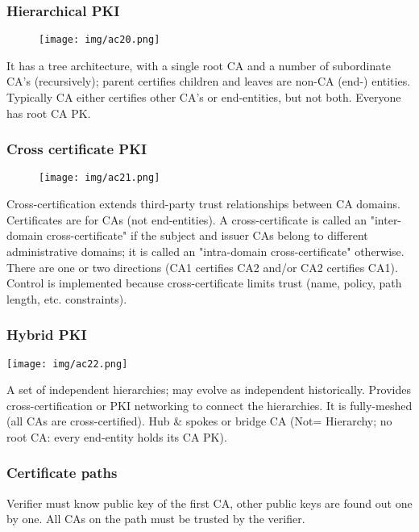 \documentclass[a4paper, 10pt, titlepage]{article}
\begin{document}
\subsubsection*{Hierarchical PKI}
\begin{figure}[h]
\centering
\texttt{[image: img/ac20.png]}
\end{figure}
It has a tree architecture, with a single root CA and a number of subordinate CA’s (recursively); parent certifies children and leaves are non-CA (end-) entities.
Typically CA either certifies other CA’s or end-entities, but not both. Everyone has root CA PK.

\subsubsection*{Cross certificate PKI}
\begin{figure}[h]
\centering
\texttt{[image: img/ac21.png]}
\end{figure}
Cross-certification extends third-party trust relationships between CA domains. Certificates are for CAs (not end-entities).  A cross-certificate is called an "inter-domain cross-certificate" if the subject and issuer CAs belong to different administrative domains; it is called an "intra-domain cross-certificate" otherwise.
There are one or two directions (CA1 certifies CA2 and/or CA2 certifies CA1). Control is implemented because cross-certificate limits trust (name, policy, path length, etc. constraints).

\subsubsection*{Hybrid PKI}
\begin{center}
\texttt{[image: img/ac22.png]}
\end{center}
A set of independent hierarchies; may evolve as independent historically. Provides cross-certification or PKI networking to connect the hierarchies. It is fully-meshed  (all CAs are cross-certified). Hub \& spokes or bridge CA (Not= Hierarchy; no root CA: every end-entity holds its CA PK). %

\subsubsection{Certificate paths}
Verifier must know public key of the first CA, other public keys are found out one by one. All CAs on the path must be trusted by the verifier.
\end{document}
